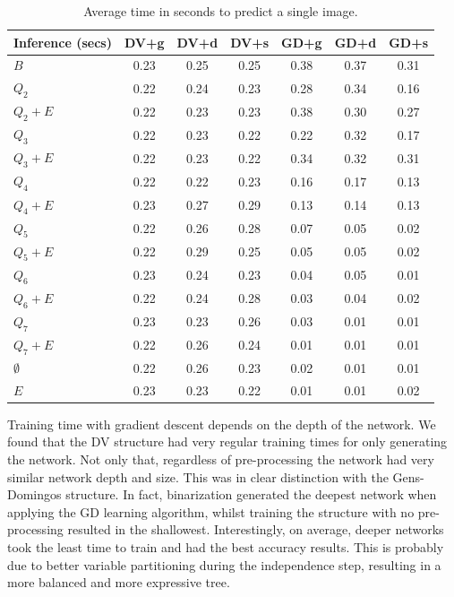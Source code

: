 \begin{table}[h]
  \centering
  \begin{tabular}{l|c|c|c|c|c|c}
    \hline
    \multicolumn{1}{c}{\bfseries Inference (secs)} & \multicolumn{1}{c}{\bfseries DV+g} &
    \multicolumn{1}{c}{\bfseries DV+d} & \multicolumn{1}{c}{\bfseries DV+s} &
    \multicolumn{1}{c}{\bfseries GD+g} & \multicolumn{1}{c}{\bfseries GD+d} &
    \multicolumn{1}{c}{\bfseries GD+s}\\
    \hline
    $B$         & 0.23 & 0.25 & 0.25 & 0.38 & 0.37 & 0.31 \\
    $Q_2$       & 0.22 & 0.24 & 0.23 & 0.28 & 0.34 & 0.16 \\
    $Q_2+E$     & 0.22 & 0.23 & 0.23 & 0.38 & 0.30 & 0.27 \\
    $Q_3$       & 0.22 & 0.23 & 0.22 & 0.22 & 0.32 & 0.17 \\
    $Q_3+E$     & 0.22 & 0.23 & 0.22 & 0.34 & 0.32 & 0.31 \\
    $Q_4$       & 0.22 & 0.22 & 0.23 & 0.16 & 0.17 & 0.13 \\
    $Q_4+E$     & 0.23 & 0.27 & 0.29 & 0.13 & 0.14 & 0.13 \\
    $Q_5$       & 0.22 & 0.26 & 0.28 & 0.07 & 0.05 & 0.02 \\
    $Q_5+E$     & 0.22 & 0.29 & 0.25 & 0.05 & 0.05 & 0.02 \\
    $Q_6$       & 0.23 & 0.24 & 0.23 & 0.04 & 0.05 & 0.01 \\
    $Q_6+E$     & 0.22 & 0.24 & 0.28 & 0.03 & 0.04 & 0.02 \\
    $Q_7$       & 0.23 & 0.23 & 0.26 & 0.03 & 0.01 & 0.01 \\
    $Q_7+E$     & 0.22 & 0.26 & 0.24 & 0.01 & 0.01 & 0.01 \\
    $\emptyset$ & 0.22 & 0.26 & 0.23 & 0.02 & 0.01 & 0.01 \\
    $E$         & 0.23 & 0.23 & 0.22 & 0.01 & 0.01 & 0.02 \\
  \end{tabular}
  \caption{Average time in seconds to predict a single image.\label{tab:time-inference}}
\end{table}
Training time with gradient descent depends on the depth of the network. We found that the DV
structure had very regular training times for only generating the network. Not only that,
regardless of pre-processing the network had very similar network depth and size. This was in clear
distinction with the Gens-Domingos structure. In fact, binarization generated the deepest network
when applying the GD learning algorithm, whilst training the structure with no pre-processing
resulted in the shallowest. Interestingly, on average, deeper networks took the least time to train
and had the best accuracy results. This is probably due to better variable partitioning during the
independence step, resulting in a more balanced and more expressive tree.

